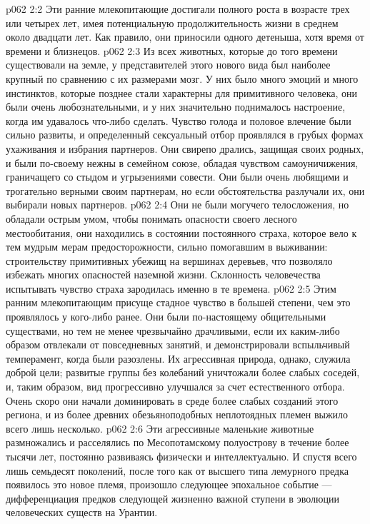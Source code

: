 \vs p062 2:2 Эти ранние млекопитающие достигали полного роста в возрасте трех или четырех лет, имея потенциальную продолжительность жизни в среднем около двадцати лет. Как правило, они приносили одного детеныша, хотя время от времени и близнецов.
\vs p062 2:3 Из всех животных, которые до того времени существовали на земле, у представителей этого нового вида был наиболее крупный по сравнению с их размерами мозг. У них было много эмоций и много инстинктов, которые позднее стали характерны для примитивного человека, они были очень любознательными, и у них значительно поднималось настроение, когда им удавалось что\hyp{}либо сделать. Чувство голода и половое влечение были сильно развиты, и определенный сексуальный отбор проявлялся в грубых формах ухаживания и избрания партнеров. Они свирепо дрались, защищая своих родных, и были по\hyp{}своему нежны в семейном союзе, обладая чувством самоуничижения, граничащего со стыдом и угрызениями совести. Они были очень любящими и трогательно верными своим партнерам, но если обстоятельства разлучали их, они выбирали новых партнеров.
\vs p062 2:4 Они не были могучего телосложения, но обладали острым умом, чтобы понимать опасности своего лесного местообитания, они находились в состоянии постоянного страха, которое вело к тем мудрым мерам предосторожности, сильно помогавшим в выживании: строительству примитивных убежищ на вершинах деревьев, что позволяло избежать многих опасностей наземной жизни. Склонность человечества испытывать чувство страха зародилась именно в те времена.
\vs p062 2:5 Этим ранним млекопитающим присуще стадное чувство в большей степени, чем это проявлялось у кого\hyp{}либо ранее. Они были по\hyp{}настоящему общительными существами, но тем не менее чрезвычайно драчливыми, если их каким\hyp{}либо образом отвлекали от повседневных занятий, и демонстрировали вспыльчивый темперамент, когда были разозлены. Их агрессивная природа, однако, служила доброй цели; развитые группы без колебаний уничтожали более слабых соседей, и, таким образом, вид прогрессивно улучшался за счет естественного отбора. Очень скоро они начали доминировать в среде более слабых созданий этого региона, и из более древних обезьяноподобных неплотоядных племен выжило всего лишь несколько.
\vs p062 2:6 Эти агрессивные маленькие животные размножались и расселялись по Месопотамскому полуострову в течение более тысячи лет, постоянно развиваясь физически и интеллектуально. И спустя всего лишь семьдесят поколений, после того как от высшего типа лемурного предка появилось это новое племя, произошло следующее эпохальное событие ---  дифференциация предков следующей жизненно важной ступени в эволюции человеческих существ на Урантии.
